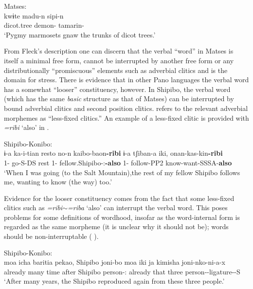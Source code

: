 \documentclass[output=paper,hidelinks]{langscibook}
\begin{document}
\newpage
\ea \label{ex:fleck}
    Matses: \\
    \gll kwɨte  madu-n sipi-n \\
    dicot.tree  demon-\Gen{} tamarin-\Erg{} \\
    \glt `Pygmy marmosets gnaw the trunks of dicot trees.' \citep[342]{fleck2003grammar}
\z 

From Fleck's description one can discern that the verbal ``word'' in Matses is itself a minimal free form, cannot be interrupted by another free form or any distributionally ``promiscuous'' elements such as adverbial clitics and is the domain for stress. 
There is evidence that in other Pano languages the verbal word has a somewhat ``looser'' constituency, however. In Shipibo, the verbal word (which has the same \textit{basic} structure as that of Matses) can be interrupted by bound adverbial clitics and second position clitics. \citet[145--146]{valenzuela2003transitivity} refers to the relevant adverbial morphemes as ``less-fixed clitics.'' An example of a less-fixed clitic is provided with \textit{=ribi} `also' in .

\ea \label{ex:shipibo1}
    Shipibo-Konibo: \\
    \gll ɨ-a ka-i-tian resto no-n kaibo-baon\textbf{-ribi} ɨ-a tʃiban-a iki, onan-kas-kin\textbf{-ribi} \\
    1-\Abs{} go-S-DS rest 1\Pl{}-\Gen{} fellow.Shipibo-\Pl{}:\Erg{}\textbf{-also} 1-\Abs{} follow-PP2 \Aux{} know-want-SSSA-\textbf{also} \\
    \glt   `When I was going (to the Salt Mountain),the rest of my fellow Shipibo follows me, wanting to know (the way) too.' \citep[145]{valenzuela:phd}
\z

Evidence for the looser constituency comes from the fact that some less-fixed clitics such as \textit{=ribi$\sim$=riba} `also' can interrupt the verbal word. This poses problems for some definitions of wordhood, insofar as the word-internal form is regarded as the same morpheme (it is unclear why it should not be); words should be non-interruptable (\cite[92]{martinet1962functional} \cite[17]{bauer2017compounds}).

\ea \label{ex:shipibo2}
    Shipibo-Konibo: \\
    \gll moa icha baritia pekao, Shipibo joni-bo moa  iki ja kimisha joni-nko-ni-a-x \\
    already many time after Shipibo person-\Pl{}:\Abs{} already  \Aux{} that three person-\Loc{}-ligature-\Abl{}-S    \\
    \glt `After many years, the Shipibo reproduced again from these three people.' \citep[146]{valenzuela:phd}
\z 
\end{document}
